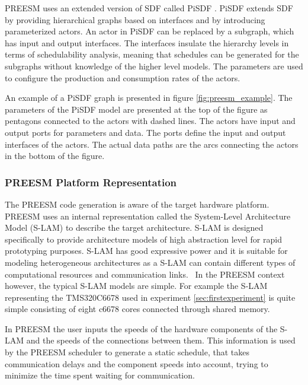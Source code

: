 PREESM uses an extended version of SDF called PiSDF \cite{pelcat2014preesm}. PiSDF extends SDF by providing hierarchical graphs based on interfaces and by introducing parameterized actors. An actor in PiSDF can be replaced by a subgraph, which has input and output interfaces. The interfaces insulate the hierarchy levels in terms of schedulability analysis, meaning that schedules can be generated for the subgraphs without knowledge of the higher level models. The parameters are used to configure the production and consumption rates of the actors.~\cite{desnos2013pimm}

An example of a PiSDF graph is presented in figure \ref{fig:preesm_example}. The parameters of the PiSDF model are presented at the top of the figure as pentagons connected to the actors with dashed lines. The actors have input and output ports for parameters and data. The ports define the input and output interfaces of the actors. The actual data paths are the arcs connecting the actors in the bottom of the figure.

\subsubsection{PREESM Platform Representation}
\label{subsubsec:preesm-hardware}
The PREESM code generation is aware of the target hardware platform. PREESM uses an internal representation called the System-Level Architecture Model (S-LAM) \cite{pelcat2009system} to describe the target architecture. S-LAM is designed specifically to provide architecture models of high abstraction level for rapid prototyping purposes. S-LAM has good expressive power and it is suitable for modeling heterogeneous architectures as a S-LAM can contain different types of computational resources and communication links.~\cite{pelcat2009system} In the PREESM context however, the typical S-LAM models are simple. For example the S-LAM representing the TMS320C6678 used in experiment \ref{sec:firstexperiment} is quite simple consisting of eight c6678 cores connected through shared memory.

In PREESM the user inputs the speeds of the hardware components of the S-LAM and the speeds of the connections between them. This information is used by the PREESM scheduler to generate a static schedule, that takes communication delays and the component speeds into account, trying to minimize the time spent waiting for communication.~\cite{pelcat2009system}

